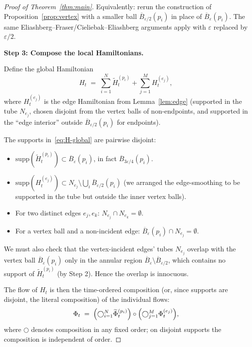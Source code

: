 \documentclass[12pt]{article}
\theoremstyle{definition}
\begin{document}
\begin{proof}[Proof of Theorem~\ref{thm:main}]
Equivalently: rerun the construction of Proposition~\ref{prop:vertex} with a smaller ball $\overline{B}_{\varepsilon/2}(p_i)$ in place of $\overline{B}_\varepsilon(p_i)$. The same Eliashberg--Fraser/Cieliebak--Eliashberg arguments apply with $\varepsilon$ replaced by $\varepsilon/2$.

\smallskip\noindent\textbf{Step 3: Compose the local Hamiltonians.}

Define the global Hamiltonian
\begin{equation}\label{eq:H-global}
H_t \;=\; \sum_{i=1}^N \widetilde H_t^{(p_i)} + \sum_{j=1}^M H_t^{(e_j)},
\end{equation}
where $H_t^{(e_j)}$ is the edge Hamiltonian from Lemma~\ref{lem:edge} (supported in the tube $N_{e_j}$, chosen disjoint from the vertex balls of non-endpoints, and supported in the ``edge interior'' outside $\overline{B}_{\varepsilon/2}(p_i)$ for endpoints).

The supports in~\eqref{eq:H-global} are pairwise disjoint:
\begin{itemize}
\item $\mathrm{supp}(\widetilde H_t^{(p_i)})\subset\overline{B}_{\varepsilon}(p_i)$, in fact $\overline{B}_{3\varepsilon/4}(p_i)$.
\item $\mathrm{supp}(H_t^{(e_j)})\subset N_{e_j}\setminus\bigcup_i\overline{B}_{\varepsilon/2}(p_i)$ (we arranged the edge-smoothing to be supported in the tube but outside the inner vertex balls).
\item For two distinct edges $e_j,e_k$: $N_{e_j}\cap N_{e_k}=\emptyset$.
\item For a vertex ball and a non-incident edge: $\overline{B}_\varepsilon(p_i)\cap N_{e_j}=\emptyset$.
\end{itemize}

We must also check that the vertex-incident edges' tubes $N_{e_j}$ overlap with the vertex ball $\overline{B}_\varepsilon(p_i)$ only in the annular region $\overline{B}_\varepsilon\setminus\overline{B}_{\varepsilon/2}$, which contains no support of $\widetilde H_t^{(p_i)}$ (by Step 2). Hence the overlap is innocuous.

The flow of $H_t$ is then the time-ordered composition (or, since supports are disjoint, the literal composition) of the individual flows:
\begin{equation}\label{eq:Phi-global}
\Phi_t \;=\; \Bigl(\bigcirc_{i=1}^N\widetilde\Phi_t^{(p_i)}\Bigr)\circ\Bigl(\bigcirc_{j=1}^M\Phi_t^{(e_j)}\Bigr),
\end{equation}
where $\bigcirc$ denotes composition in any fixed order; on disjoint supports the composition is independent of order.


\end{proof}
\end{document}
